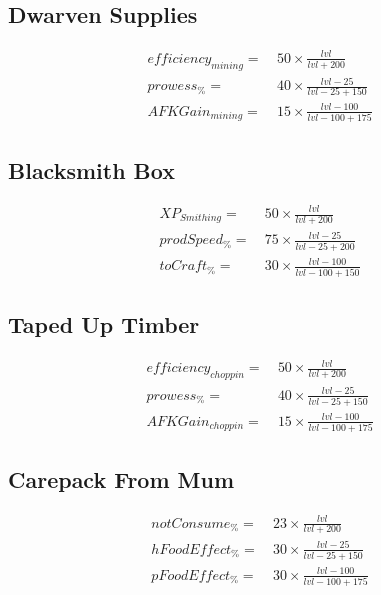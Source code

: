     \subsection{Dwarven Supplies}
        \begin{align*}
            efficiency_{mining} = &\   50 \times \frac{{lvl}}{{lvl}+200}
            \\
            prowess_\% = &\  40 \times \frac{{lvl}-25}{{lvl}-25+150}
            \\
            AFKGain_{mining} = &\  15 \times \frac{{lvl}-100}{{lvl}-100+175}
        \end{align*}

    \subsection{Blacksmith Box}
        \begin{align*}
            XP_{Smithing} = &\  50 \times \frac{{lvl}}{{lvl}+200}
            \\
            prodSpeed_\% = &\  75 \times \frac{{lvl}-25}{{lvl}-25+200}
            \\
            toCraft_\% = &\  30 \times \frac{{lvl}-100}{{lvl}-100+150}
        \end{align*}

    \subsection{Taped Up Timber}
        \begin{align*}
            efficiency_{choppin} = &\   50 \times \frac{{lvl}}{{lvl}+200}
            \\
            prowess_\% = &\  40 \times \frac{{lvl}-25}{{lvl}-25+150}
            \\
            AFKGain_{choppin}= &\  15 \times \frac{{lvl}-100}{{lvl}-100+175}
        \end{align*}

    \subsection{Carepack From Mum}
        \begin{align*}
            notConsume_\%= &\  23 \times \frac{{lvl}}{{lvl}+200}
            \\
            hFoodEffect_\%= &\  30 \times \frac{{lvl}-25}{{lvl}-25+150}
            \\
            pFoodEffect_\% = &\  30 \times \frac{{lvl}-100}{{lvl}-100+175}
        \end{align*}

